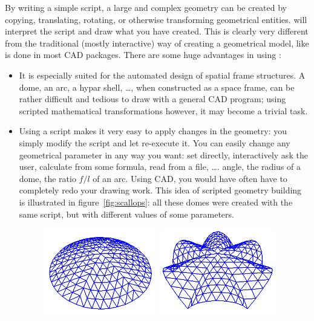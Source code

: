 By writing a simple script, a large and complex geometry can be created by copying, translating, rotating, or otherwise transforming geometrical entities. \pyformex will interpret the script and draw what you have created. This is clearly very different from the traditional (mostly interactive) way of creating a geometrical model, like is done in most CAD packages. There are some huge advantages in using \pyformex:
\begin{itemize}
\item It is especially suited for the automated design of spatial frame structures. A dome, an arc, a hypar shell, \dots, when constructed as a space frame, can be rather difficult and tedious to draw with a general CAD program; using scripted mathematical transformations however, it may become a trivial task.
\item Using a script makes it very easy to apply changes in the geometry: you simply modify the script and let \pyformex re-execute it. You can easily change any geometrical parameter in any way you want: set directly, interactively ask the user, calculate from some formula, read from a file, \dots.  angle, the radius of a dome, the ratio $f/l$ of an arc. Using CAD, you would have often have to completely redo your drawing work. This idea of scripted geometry building is illustrated in figure~\ref{fig:scallops}: all these domes were created with the same script, but with different values of some parameters.
\begin{figure}[ht]
  \centering
  \begin{makeimage}
  \end{makeimage}
  \begin{latexonly}
    \includegraphics[width=5cm]{images/scallopdome-000}
    \includegraphics[width=5cm]{images/scallopdome-001}

\end{latexonly}
\end{figure}
\end{itemize}
